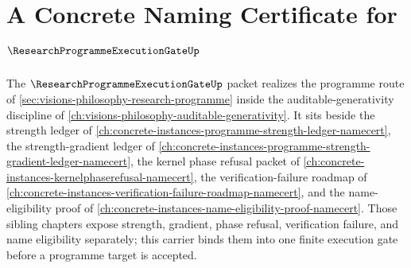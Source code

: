 \chapter{A Concrete Naming Certificate for $\ResearchProgrammeExecutionGateUp$}
\label{ch:concrete-instances-research-programme-execution-gate-namecert}

The $\ResearchProgrammeExecutionGateUp$ packet realizes the programme route of \autoref{sec:visions-philosophy-research-programme} inside the auditable-generativity discipline of \autoref{ch:visions-philosophy-auditable-generativity}. It sits beside the strength ledger of \autoref{ch:concrete-instances-programme-strength-ledger-namecert}, the strength-gradient ledger of \autoref{ch:concrete-instances-programme-strength-gradient-ledger-namecert}, the kernel phase refusal packet of \autoref{ch:concrete-instances-kernelphaserefusal-namecert}, the verification-failure roadmap of \autoref{ch:concrete-instances-verification-failure-roadmap-namecert}, and the name-eligibility proof of \autoref{ch:concrete-instances-name-eligibility-proof-namecert}. Those sibling chapters expose strength, gradient, phase refusal, verification failure, and name eligibility separately; this carrier binds them into one finite execution gate before a programme target is accepted.

